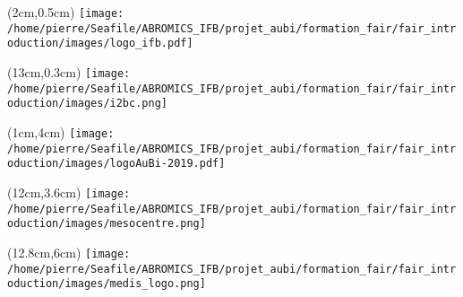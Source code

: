 
\begin{frame}
  \titlepage
  \begin{textblock*}{5cm}(2cm,0.5cm) %
  \texttt{[image: /home/pierre/Seafile/ABROMICS\_IFB/projet\_aubi/formation\_fair/fair\_introduction/images/logo\_ifb.pdf]}
  \end{textblock*}
  \begin{textblock*}{5cm}(13cm,0.3cm) %
  \texttt{[image: /home/pierre/Seafile/ABROMICS\_IFB/projet\_aubi/formation\_fair/fair\_introduction/images/i2bc.png]}
  \end{textblock*}
  \begin{textblock*}{5cm}(1cm,4cm) %
  \texttt{[image: /home/pierre/Seafile/ABROMICS\_IFB/projet\_aubi/formation\_fair/fair\_introduction/images/logoAuBi-2019.pdf]}
  \end{textblock*}
  \begin{textblock*}{5cm}(12cm,3.6cm) %
  \texttt{[image: /home/pierre/Seafile/ABROMICS\_IFB/projet\_aubi/formation\_fair/fair\_introduction/images/mesocentre.png]}
  \end{textblock*}
   \begin{textblock*}{5cm}(12.8cm,6cm) %
  \texttt{[image: /home/pierre/Seafile/ABROMICS\_IFB/projet\_aubi/formation\_fair/fair\_introduction/images/medis\_logo.png]}
  \end{textblock*}
\end{frame}

